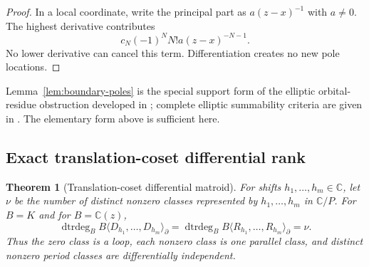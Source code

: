\documentclass[11pt]{article}
\numberwithin{equation}{section}
\newtheorem{theorem}{Theorem}[section]
\theoremstyle{definition}
\theoremstyle{remark}
\newcommand{\C}{\mathbb C}
\newcommand{\dtrdeg}{\operatorname{dtrdeg}}
\begin{document}
\begin{proof}
In a local coordinate, write the principal part as $a(z-x)^{-1}$ with
$a\neq0$.  The highest derivative contributes
\[
 c_N(-1)^NN!a(z-x)^{-N-1}.
\]
No lower derivative can cancel this term.  Differentiation creates no new
pole locations.
\end{proof}

Lemma~\ref{lem:boundary-poles} is the special support form of the elliptic
orbital-residue obstruction developed in
\cite[Appendix~B]{DreyfusHardouinRoquesSinger2018}; complete elliptic
summability criteria are given in \cite{ArrecheBabbitt2025}.  The elementary
form above is sufficient here.

\subsection{Exact translation-coset differential rank}

\begin{theorem}[Translation-coset differential matroid]
\label{thm:coset}
For shifts $h_1,\ldots,h_m\in\C$, let $\nu$ be the number of distinct
nonzero classes represented by $h_1,\ldots,h_m$ in $\C/P$.  For
$B=K$ and for $B=\C(z)$,
\begin{equation}
 \dtrdeg_B B\langle D_{h_1},\ldots,D_{h_m}\rangle_\partial
 =\dtrdeg_B B\langle R_{h_1},\ldots,R_{h_m}\rangle_\partial
 =\nu.
 \label{eq:coset-rank}
\end{equation}
Thus the zero class is a loop, each nonzero class is one parallel class, and
distinct nonzero period classes are differentially independent.
\end{theorem}
\end{document}
